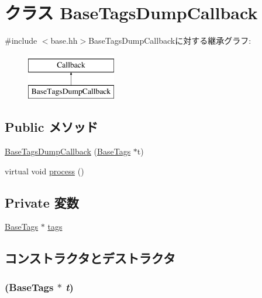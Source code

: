 \hypertarget{classBaseTagsDumpCallback}{
\section{クラス BaseTagsDumpCallback}
\label{classBaseTagsDumpCallback}
}


{\ttfamily \#include $<$base.hh$>$}BaseTagsDumpCallbackに対する継承グラフ:\begin{figure}[H]
\begin{center}
\leavevmode
\includegraphics[height=2cm]{classBaseTagsDumpCallback}
\end{center}
\end{figure}
\subsection*{Public メソッド}
\begin{DoxyCompactItemize}
\item 
\hyperlink{classBaseTagsDumpCallback_a6422f3276d92629ddd0fe9a6f3c50180}{BaseTagsDumpCallback} (\hyperlink{classBaseTags}{BaseTags} $\ast$t)
\item 
virtual void \hyperlink{classBaseTagsDumpCallback_a6780fc1879338e1ff38faf7279ec6a0b}{process} ()
\end{DoxyCompactItemize}
\subsection*{Private 変数}
\begin{DoxyCompactItemize}
\item 
\hyperlink{classBaseTags}{BaseTags} $\ast$ \hyperlink{classBaseTagsDumpCallback_a6819886aaca345d2e681ba3ef01f96c4}{tags}
\end{DoxyCompactItemize}


\subsection{コンストラクタとデストラクタ}
\hypertarget{classBaseTagsDumpCallback_a6422f3276d92629ddd0fe9a6f3c50180}{
\subsubsection[{BaseTagsDumpCallback}]{ ({\bf BaseTags} $\ast$ {\em t})}}
\label{classBaseTagsDumpCallback_a6422f3276d92629ddd0fe9a6f3c50180}



